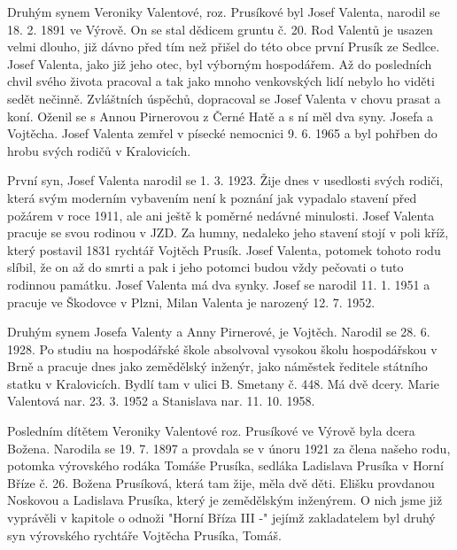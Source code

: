 \documentclass[../dejiny-rodu-prusiku.tex]{subfiles}
\begin{document}
Druhým synem Veroniky Valentové, roz. Prusíkové byl Josef Valenta, narodil se 18. 2. 1891 ve Výrově. On se stal dědicem gruntu č. 20. Rod Valentů je usazen velmi dlouho, již dávno před tím než přišel do této obce první Prusík ze Sedlce. Josef Valenta, jako již jeho otec, byl výborným hospodářem. Až do posledních chvil svého života pracoval a tak jako mnoho venkovských lidí nebylo ho viděti sedět nečinně. Zvláštních úspěchů, dopracoval se Josef Valenta v chovu prasat a koní. Oženil se s Annou Pirnerovou z Černé Hatě a s ní měl dva syny. Josefa a Vojtěcha. Josef Valenta zemřel v písecké nemoc­nici 9. 6. 1965 a byl pohřben do hrobu svých rodičů v Kralovicích.

První syn, Josef Valenta narodil se 1. 3. 1923. Žije dnes v usedlosti svých rodiči, která svým moderním vybave­ním není k poznání jak vypadalo stavení před požárem v roce 1911, ale ani ještě k poměrné nedávné minulosti. Josef Valenta pracuje se svou rodinou v JZD. Za humny, nedaleko jeho stavení stojí v poli kříž, který postavil 1831 rychtář Vojtěch Prusík. Josef Valenta, potomek tohoto rodu slíbil, že on až do smrti a pak i jeho po­tomci budou vždy pečovati o tuto rodinnou památku. Josef Valenta má dva synky. Josef se narodil 11. 1. 1951 a pracuje ve Škodovce v Plzni, Milan Valenta je narozený 12. 7. 1952.

Druhým synem Josefa Valenty a Anny Pirnerové, je Vojtěch. Narodil se 28. 6. 1928. Po studiu na hospodářské škole absolvoval vysokou školu hospodářskou v Brně a pracuje dnes jako zemědělský inženýr, jako náměstek ředitele státního statku v Kralovicích. Bydlí tam v ulici B. Smetany č. 448. Má dvě dcery. Marie Valentová nar. 23. 3. 1952 a Stanislava nar. 11. 10. 1958.

Posledním dítětem Veroniky Valentové roz. Prusíkové ve Výrově byla dcera Božena. Narodila se 19. 7. 1897 a provdala se v únoru 1921 za člena našeho rodu, po­tomka výrovského rodáka Tomáše Prusíka, sedláka Ladislava Prusíka v Horní Bříze č. 26. Božena Prusíková, která tam žije, měla dvě děti. Elišku provdanou Noskovou a Ladislava Prusíka, který je zemědělským inženýrem. O nich jsme již vyprávěli v kapitole o odnoži "Horní Bříza III -" jejímž zakladatelem byl druhý syn výrovského rychtáře Vojtěcha Prusíka, Tomáš.
\end{document}
